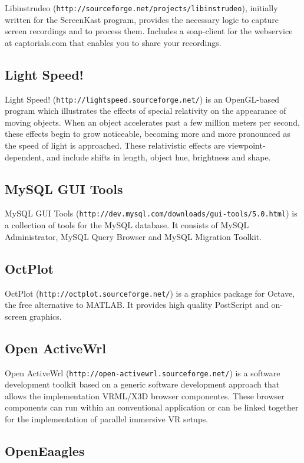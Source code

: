Libinstrudeo ({\tt http://sourceforge.net/projects/libinstrudeo}), initially written for the ScreenKast program, provides the necessary logic to capture screen recordings and to process them. Includes a soap-\/client for the webservice at captorials.com that enables you to share your recordings.\subsection{Light Speed!}\label{ftgl-projects_lightspeed}
Light Speed! ({\tt http://lightspeed.sourceforge.net/}) is an OpenGL-\/based program which illustrates the effects of special relativity on the appearance of moving objects. When an object accelerates past a few million meters per second, these effects begin to grow noticeable, becoming more and more pronounced as the speed of light is approached. These relativistic effects are viewpoint-\/dependent, and include shifts in length, object hue, brightness and shape.\subsection{MySQL GUI Tools}\label{ftgl-projects_mysqlguitools}
MySQL GUI Tools ({\tt http://dev.mysql.com/downloads/gui-\/tools/5.0.html}) is a collection of tools for the MySQL database. It consists of MySQL Administrator, MySQL Query Browser and MySQL Migration Toolkit.\subsection{OctPlot}\label{ftgl-projects_octplot}
OctPlot ({\tt http://octplot.sourceforge.net/}) is a graphics package for Octave, the free alternative to MATLAB. It provides high quality PostScript and on-\/screen graphics.\subsection{Open ActiveWrl}\label{ftgl-projects_openactivewrl}
Open ActiveWrl ({\tt http://open-\/activewrl.sourceforge.net/}) is a software development toolkit based on a generic software development approach that allows the implementation VRML/X3D browser componentes. These browser components can run within an conventional application or can be linked together for the implementation of parallel immersive VR setups.\subsection{OpenEaagles}\label{ftgl-projects_openeaagles}
